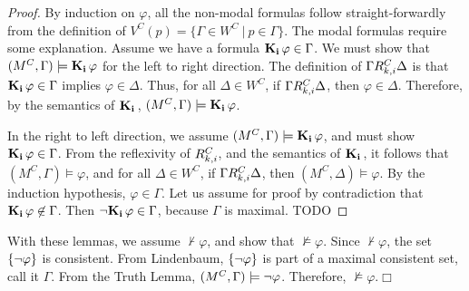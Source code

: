 \begin{proof}
	By induction on $\varphi$, all the non-modal formulas follow straight-forwardly from the definition of $V^C(p) = \{\Gamma \in W^C\ |\ p \in \Gamma\}$. The modal formulas require some explanation. Assume we have a formula $\mathbf{K}_{\mathbf{i}}\,\varphi \in \Gamma$. We must show that $(M^C, \Gamma) \models \mathbf{K}_{\mathbf{i}}\,\varphi$ for the left to right direction. The definition of $\Gamma R_{k,i}^C\Delta$ is that $\mathbf{K}_{\mathbf{i}}\,\varphi \in \Gamma$ implies $\varphi \in \Delta$. Thus, for all $\Delta \in W^C$, if $\Gamma R_{k,i}^C \Delta$, then $\varphi \in \Delta$. Therefore, by the semantics of $\mathbf{K}_{\mathbf{i}}\,$, $(M^C, \Gamma) \models \mathbf{K}_{\mathbf{i}}\,\varphi$.
	
	In the right to left direction, we assume $(M^C, \Gamma) \models \mathbf{K}_{\mathbf{i}}\,\varphi$, and must show $\mathbf{K}_{\mathbf{i}}\,\varphi \in \Gamma$. From the reflexivity of $R_{k,i}^C$, and the semantics of $\mathbf{K}_{\mathbf{i}}\,$, it follows that $(M^C,\Gamma)\models \varphi$, and for all $\Delta\in W^C$, if $\Gamma R_{k,i}^C\Delta$, then $(M^C,\Delta)\models\varphi$. By the induction hypothesis, $\varphi \in \Gamma$. Let us assume for proof by contradiction that $\mathbf{K}_{\mathbf{i}}\,\varphi \not \in \Gamma$. Then ${\neg}\mathbf{K}_{\mathbf{i}}\,\varphi\in\Gamma$, because $\Gamma$ is maximal. TODO
\end{proof}


With these lemmas, we assume $\not\vdash\varphi$, and show that $\not\models\varphi$. Since $\not\vdash\varphi$, the set $\{{\neg}\varphi\}$ is consistent. From Lindenbaum, $\{{\neg}\varphi\}$ is part of a maximal consistent set, call it $\Gamma$. From the Truth Lemma, $(M^C,\Gamma)\models{\neg}\varphi$. Therefore, $\not\models\varphi$.$\Box$


